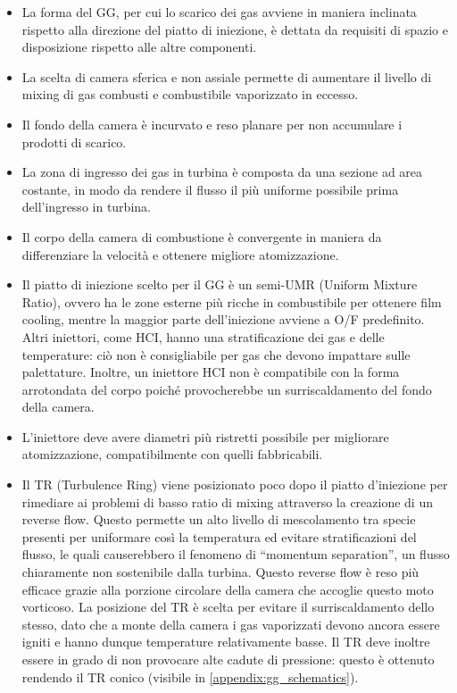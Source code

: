 \begin{itemize}[wide,itemsep=3pt,topsep=3pt]

\item
La forma del GG, per cui lo scarico dei gas avviene in maniera inclinata rispetto alla direzione del piatto di iniezione, è dettata da requisiti di spazio e disposizione rispetto alle altre componenti.

\item
La scelta di camera sferica e non assiale permette di aumentare il livello di mixing di gas combusti e combustibile vaporizzato in eccesso.

\item
Il fondo della camera è incurvato e reso planare per non accumulare i prodotti di scarico.

\item
La zona di ingresso dei gas in turbina è composta da una sezione ad area costante, in modo da rendere il flusso il più uniforme possibile prima dell'ingresso in turbina.

\item
Il corpo della camera di combustione è convergente in maniera da differenziare la velocità e ottenere migliore atomizzazione.

\item
Il piatto di iniezione scelto per il GG è un semi-UMR (Uniform Mixture Ratio), ovvero ha le zone esterne più ricche in combustibile per ottenere film cooling, mentre la maggior parte dell’iniezione avviene a O/F predefinito. Altri iniettori, come HCI, hanno una stratificazione dei gas e delle temperature: ciò non è consigliabile per gas che devono impattare sulle palettature. Inoltre, un iniettore HCI non è compatibile con la forma arrotondata del corpo poiché provocherebbe un surriscaldamento del fondo della camera.

\item
L’iniettore deve avere diametri più ristretti possibile per migliorare atomizzazione, compatibilmente con quelli fabbricabili.

\item
Il TR (Turbulence Ring) viene posizionato poco dopo il piatto d'iniezione per rimediare ai problemi di basso ratio di mixing attraverso la creazione di un reverse flow. Questo permette un alto livello di mescolamento tra specie presenti per uniformare così la temperatura ed evitare stratificazioni del flusso, le quali causerebbero il fenomeno di “momentum separation”, un flusso chiaramente non sostenibile dalla turbina. Questo reverse flow è reso più efficace grazie alla porzione circolare della camera che accoglie questo moto vorticoso. La posizione del TR è scelta per evitare il surriscaldamento dello stesso, dato che a monte della camera i gas vaporizzati devono ancora essere igniti e hanno dunque temperature relativamente basse. Il TR deve inoltre essere in grado di non provocare alte cadute di pressione: questo è ottenuto rendendo il TR conico (visibile in \autoref{appendix:gg_schematics}).


\end{itemize}
